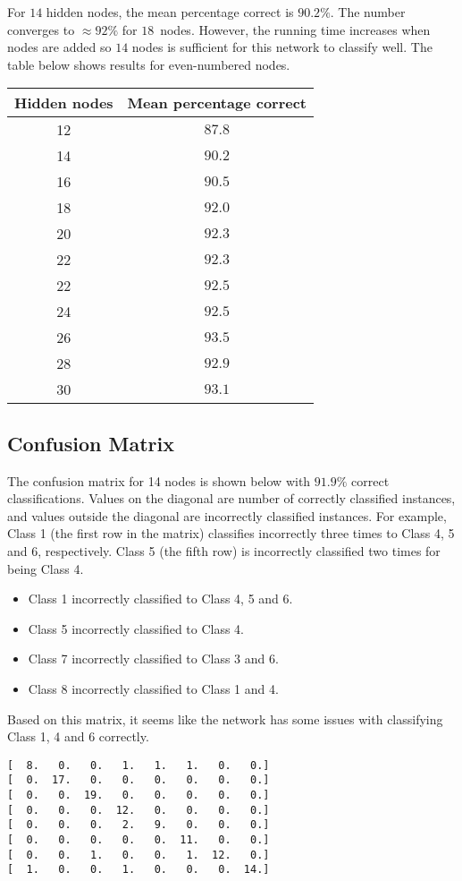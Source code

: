 \documentclass{article}
\begin{document}
\noindent For $14$ hidden nodes, the mean percentage correct is $90.2\%$. The number converges to $\approx 92\%$ for $18$ nodes. However, the running time increases when nodes are added so $14$ nodes is sufficient for this network to classify well. The table below shows results for even-numbered nodes.

\begin{center}
\begin{tabular}{cc}
\toprule
Hidden nodes & Mean percentage correct \\
\midrule
12 & $87.8$\\
14 & $90.2$\\
16 & $90.5$\\
18 & $92.0$\\
20 & $92.3$\\
22 & $92.3$\\
22 & $92.5$\\
24 & $92.5$\\
26 & $93.5$\\
28 & $92.9$\\
30 & $93.1$\\
\bottomrule
\end{tabular}
\end{center}

\subsection*{Confusion Matrix}

\noindent The confusion matrix for 14 nodes is shown below with $91.9\%$ correct classifications. Values on the diagonal are number of correctly classified instances, and values outside the diagonal are incorrectly classified instances. For example, Class 1 (the first row in the matrix) classifies incorrectly three times to Class 4, 5 and 6, respectively. Class 5 (the fifth row) is incorrectly classified two times for being Class 4.

\begin{itemize}
    \item Class 1 incorrectly classified to Class 4, 5 and 6.
    \item Class 5 incorrectly classified to Class 4.
    \item Class 7 incorrectly classified to Class 3 and 6.
    \item Class 8 incorrectly classified to Class 1 and 4.
\end{itemize}

\noindent Based on this matrix, it seems like the network has some issues with classifying Class 1, 4 and 6 correctly.

\begin{center}
\begin{verbatim}
[  8.   0.   0.   1.   1.   1.   0.   0.]
[  0.  17.   0.   0.   0.   0.   0.   0.]
[  0.   0.  19.   0.   0.   0.   0.   0.]
[  0.   0.   0.  12.   0.   0.   0.   0.]
[  0.   0.   0.   2.   9.   0.   0.   0.]
[  0.   0.   0.   0.   0.  11.   0.   0.]
[  0.   0.   1.   0.   0.   1.  12.   0.]
[  1.   0.   0.   1.   0.   0.   0.  14.]
\end{verbatim}
\end{center}
\end{document}
